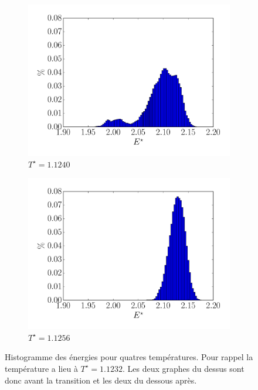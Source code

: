 \documentclass[11pt,a4paper]{article}
\numberwithin{equation}{section}
\begin{document}
\begin{figure}
    \begin{subfigure}[b]{0.49\textwidth}
    	\center
    	\includegraphics[scale=0.4]{figures/histo_11240.pdf}
    	\caption{$T^\star =1.1240$}
    	\label{11240}
    \end{subfigure}	
    \begin{subfigure}[b]{0.49\textwidth}
    	\center
    	\includegraphics[scale=0.4]{figures/histo_11256.pdf}
    	\caption{$T^\star =1.1256$}
    	\label{11256}
    \end{subfigure}	
    \caption{Histogramme des énergies pour quatres températures. Pour rappel la température a lieu à $T^\star = 1.1232$. Les deux graphes du dessus sont donc avant la transition et les deux du dessous après.}
    \label{histoo}
\end{figure}
\end{document}
